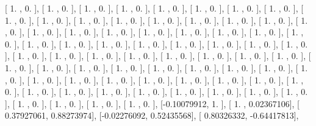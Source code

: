 \documentclass{article}
\begin{document}
       [ 1.        ,  0.        ],
       [ 1.        ,  0.        ],
       [ 1.        ,  0.        ],
       [ 1.        ,  0.        ],
       [ 1.        ,  0.        ],
       [ 1.        ,  0.        ],
       [ 1.        ,  0.        ],
       [ 1.        ,  0.        ],
       [ 1.        ,  0.        ],
       [ 1.        ,  0.        ],
       [ 1.        ,  0.        ],
       [ 1.        ,  0.        ],
       [ 1.        ,  0.        ],
       [ 1.        ,  0.        ],
       [ 1.        ,  0.        ],
       [ 1.        ,  0.        ],
       [ 1.        ,  0.        ],
       [ 1.        ,  0.        ],
       [ 1.        ,  0.        ],
       [ 1.        ,  0.        ],
       [ 1.        ,  0.        ],
       [ 1.        ,  0.        ],
       [ 1.        ,  0.        ],
       [ 1.        ,  0.        ],
       [ 1.        ,  0.        ],
       [ 1.        ,  0.        ],
       [ 1.        ,  0.        ],
       [ 1.        ,  0.        ],
       [ 1.        ,  0.        ],
       [ 1.        ,  0.        ],
       [ 1.        ,  0.        ],
       [ 1.        ,  0.        ],
       [ 1.        ,  0.        ],
       [ 1.        ,  0.        ],
       [ 1.        ,  0.        ],
       [ 1.        ,  0.        ],
       [ 1.        ,  0.        ],
       [ 1.        ,  0.        ],
       [ 1.        ,  0.        ],
       [ 1.        ,  0.        ],
       [ 1.        ,  0.        ],
       [ 1.        ,  0.        ],
       [ 1.        ,  0.        ],
       [ 1.        ,  0.        ],
       [ 1.        ,  0.        ],
       [ 1.        ,  0.        ],
       [ 1.        ,  0.        ],
       [ 1.        ,  0.        ],
       [ 1.        ,  0.        ],
       [ 1.        ,  0.        ],
       [ 1.        ,  0.        ],
       [ 1.        ,  0.        ],
       [ 1.        ,  0.        ],
       [ 1.        ,  0.        ],
       [ 1.        ,  0.        ],
       [ 1.        ,  0.        ],
       [ 1.        ,  0.        ],
       [ 1.        ,  0.        ],
       [ 1.        ,  0.        ],
       [ 1.        ,  0.        ],
       [ 1.        ,  0.        ],
       [ 1.        ,  0.        ],
       [ 1.        ,  0.        ],
       [ 1.        ,  0.        ],
       [ 1.        ,  0.        ],
       [ 1.        ,  0.        ],
       [ 1.        ,  0.        ],
       [ 1.        ,  0.        ],
       [ 1.        ,  0.        ],
       [ 1.        ,  0.        ],
       [-0.10079912,  1.        ],
       [ 1.        ,  0.02367106],
       [ 0.37927061,  0.88273974],
       [-0.02276092,  0.52435568],
       [ 0.80326332, -0.64417813],
\end{document}
